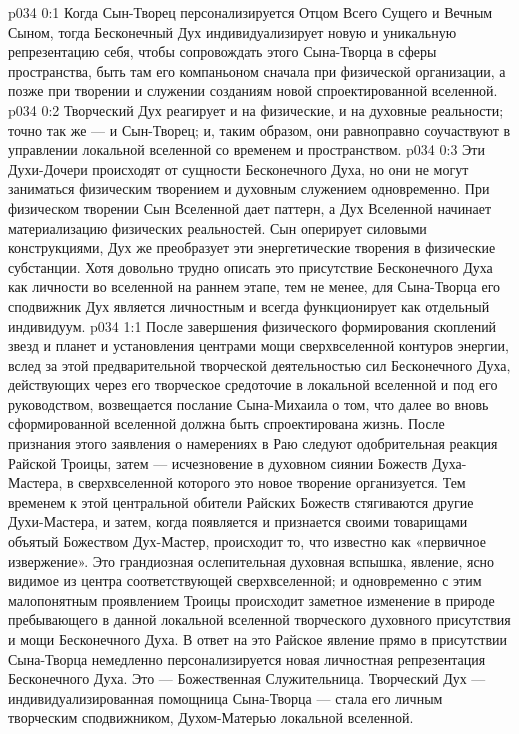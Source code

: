 \vs p034 0:1 Когда Сын\hyp{}Творец персонализируется Отцом Всего Сущего и Вечным Сыном, тогда Бесконечный Дух индивидуализирует новую и уникальную репрезентацию себя, чтобы сопровождать этого Сына\hyp{}Творца в сферы пространства, быть там его компаньоном сначала при физической организации, а позже при творении и служении созданиям новой спроектированной вселенной.
\vs p034 0:2 Творческий Дух реагирует и на физические, и на духовные реальности; точно так же --- и Сын\hyp{}Творец; и, таким образом, они равноправно соучаствуют в управлении локальной вселенной со временем и пространством.
\vs p034 0:3 Эти Духи\hyp{}Дочери происходят от сущности Бесконечного Духа, но они не могут заниматься физическим творением и духовным служением одновременно. При физическом творении Сын Вселенной дает паттерн, а Дух Вселенной начинает материализацию физических реальностей. Сын оперирует силовыми конструкциями, Дух же преобразует эти энергетические творения в физические субстанции. Хотя довольно трудно описать это присутствие Бесконечного Духа как личности во вселенной на раннем этапе, тем не менее, для Сына\hyp{}Творца его сподвижник Дух является личностным и всегда функционирует как отдельный индивидуум.
\vs p034 1:1 После завершения физического формирования скоплений звезд и планет и установления центрами мощи сверхвселенной контуров энергии, вслед за этой предварительной творческой деятельностью сил Бесконечного Духа, действующих через его творческое средоточие в локальной вселенной и под его руководством, возвещается послание Сына\hyp{}Михаила о том, что далее во вновь сформированной вселенной должна быть спроектирована жизнь. После признания этого заявления о намерениях в Раю следуют одобрительная реакция Райской Троицы, затем --- исчезновение в духовном сиянии Божеств Духа\hyp{}Мастера, в сверхвселенной которого это новое творение организуется. Тем временем к этой центральной обители Райских Божеств стягиваются другие Духи\hyp{}Мастера, и затем, когда появляется и признается своими товарищами объятый Божеством Дух\hyp{}Мастер, происходит то, что известно как «первичное извержение». Это грандиозная ослепительная духовная вспышка, явление, ясно видимое из центра соответствующей сверхвселенной; и одновременно с этим малопонятным проявлением Троицы происходит заметное изменение в природе пребывающего в данной локальной вселенной творческого духовного присутствия и мощи Бесконечного Духа. В ответ на это Райское явление прямо в присутствии Сына\hyp{}Творца немедленно персонализируется новая личностная репрезентация Бесконечного Духа. Это --- Божественная Служительница. Творческий Дух --- индивидуализированная помощница Сына\hyp{}Творца --- стала его личным творческим сподвижником, Духом\hyp{}Матерью локальной вселенной.
